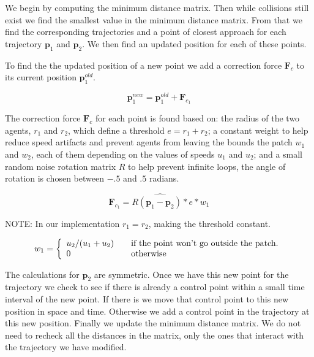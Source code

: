 We begin by computing the minimum distance matrix. Then while collisions still exist we find the smallest value in the minimum distance matrix. From that we find the corresponding trajectories and a point of closest approach for each trajectory $\mathbf{p}_1$ and $\mathbf{p}_2$. We then find an updated position for each of these points.

To find the the updated position of a new point we add a correction force $\mathbf{F}_c$ to its current position $\mathbf{p}_1^{old}$.


\begin{equation}
	\mathbf{p}_1^{new} = \mathbf{p}_1^{old} + \mathbf{F}_{c_1}
\end{equation}



The correction force $\mathbf{F}_c$ for each point is found based on: the radius of the two agents, $r_1$ and $r_2$, which define a threshold $e=r_1+r_2$; a constant weight to help reduce speed artifacts and prevent agents from leaving the bounds the patch $w_1$ and $w_2$, each of them depending on the values of speeds $u_1$ and $u_2$; and a small random noise rotation matrix $R$ to help prevent infinite loops, the angle of rotation is chosen between $-.5$ and $.5$ radians.

\begin{equation}
	 \mathbf{F}_{c_1}= R  \widehat{(\mathbf{p}_1 - \mathbf{p}_2)}* e * w_1
\end{equation}

NOTE: In our implementation $r_1 = r_2$, making the threshold constant.

\begin{equation}
w_1 = \left\{
	\begin{array}{l l}
		u_2 / (u_1 + u_2)	&	\quad \text{if the point won't go outside the patch.}\\
		0								&	\quad \text{otherwise}
	\end{array}
	\right.
\end{equation}

The calculations for $\mathbf{p}_2$ are symmetric. Once we have this new point for the trajectory we check to see if there is already a control point within a small time interval of the new point. If there is we move that control point to this new position in space and time. Otherwise we add a control 
point in the trajectory at this new position. Finally we update the minimum distance matrix. We do not need to recheck all the distances in the matrix, only the ones that interact with the trajectory we have modified.

